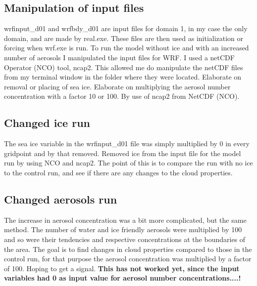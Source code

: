 \subsection{Manipulation of input files}
wrfinput\_d01 and wrfbdy\_d01 are input files for domain 1, in my case the only domain, and are made by real.exe. These files are then used as initialization or forcing when wrf.exe is run.
To run the model without ice and with an increased number of aerosols I manipulated the input files for WRF. I used a netCDF Operator (NCO) tool, ncap2. This allowed me do manipulate the netCDF files from my terminal window in the folder where they were located.
Elaborate on removal or placing of sea ice. Elaborate on multiplying the aerosol number concentration with a factor 10 or 100. By use of ncap2 from NetCDF (NCO).

\subsection{Changed ice run}
The sea ice variable in the wrfinput\_d01 file was simply multiplied by 0 in every gridpoint and by that removed.
Removed ice from the input file for the model run by using NCO and ncap2. The point of this is to compare the run with no ice to the control run, and see if there are any changes to the cloud properties.

\subsection{Changed aerosols run}
The increase in aerosol concentration was a bit more complicated, but the same method. The number of water and ice friendly aerosols were multiplied by 100 and so were their tendencies and respective concentrations at the boundaries of the area. %
The goal is to find changes in cloud properties compared to those in the control run, for that purpose the aerosol concentration was multiplied by a factor of 100. Hoping to get a signal. \textbf{This has not worked yet, since the input variables had 0 as input value for aerosol number concentrations....!}

